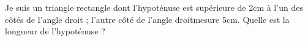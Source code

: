 
Je suis un triangle rectangle dont l’hypoténuse est supérieure de 2cm à l’un des côtés de l’angle droit ; l’autre côté de
l’angle droitmesure 5cm.
Quelle est la longueur de l’hypoténuse ?